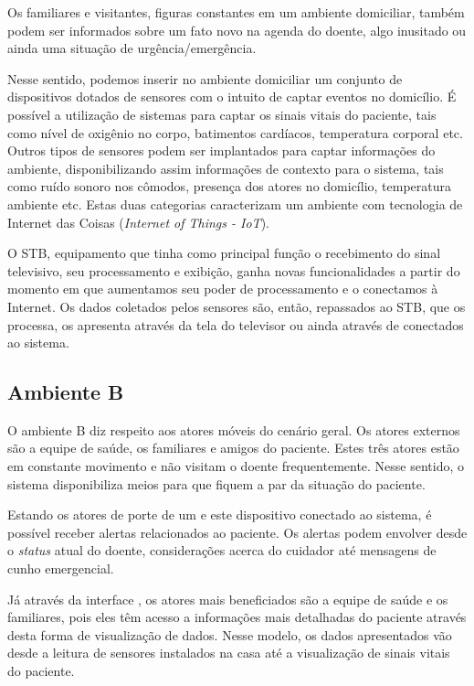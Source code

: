 Os familiares e visitantes, figuras constantes em um ambiente domiciliar, também
podem ser informados sobre um fato novo na agenda do doente, algo inusitado ou 
ainda uma situação de urgência/emergência.

Nesse sentido, podemos inserir no ambiente domiciliar um conjunto de
dispositivos dotados de sensores com o intuito de captar eventos no domicílio. É
possível a utilização de sistemas para captar os sinais vitais do paciente, tais
como nível de oxigênio no corpo, batimentos cardíacos, temperatura corporal etc.
Outros tipos de sensores podem ser implantados para captar informações do
ambiente, disponibilizando assim informações de contexto para o sistema,  tais
como ruído sonoro nos cômodos, presença dos atores no domicílio, temperatura
ambiente etc. Estas duas categorias caracterizam um  ambiente com tecnologia de
Internet das Coisas (\textit{Internet of Things  - IoT}).

O STB, equipamento que tinha como principal função o recebimento do sinal
televisivo, seu processamento e  exibição, ganha novas funcionalidades a partir
do momento em que aumentamos seu  poder de processamento e o conectamos à 
Internet. Os dados coletados pelos sensores são, então, repassados ao STB,
que os processa, os apresenta através da tela do televisor ou ainda através de
\smartphones[] conectados ao sistema.

\subsection{Ambiente B} \label{subsec:ambiente-b}

O ambiente B diz respeito aos atores móveis do cenário geral. Os atores externos
são a equipe de saúde, os familiares e amigos do paciente. Estes três atores
estão em constante movimento e não visitam o doente frequentemente. Nesse
sentido, o sistema disponibiliza meios para que fiquem a par da situação do
paciente.

Estando os atores de porte de um \smartphone[] e este dispositivo conectado ao
sistema, é possível receber alertas relacionados ao paciente. Os alertas podem
envolver desde o \textit{status} atual do doente, considerações acerca do
cuidador até mensagens de cunho emergencial.

Já através da interface \web[], os atores mais beneficiados são a equipe de
saúde e os familiares, pois eles têm acesso a informações mais detalhadas do
paciente através desta forma de visualização de dados. Nesse modelo, os dados
apresentados vão desde a leitura de sensores instalados na casa até a
visualização de sinais vitais do paciente.

